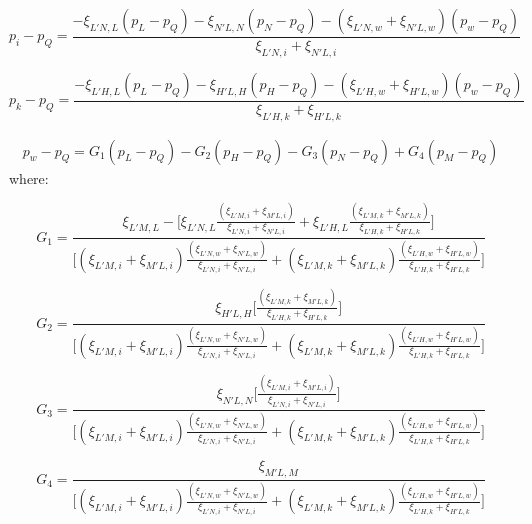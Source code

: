\documentclass{article}
\begin{document}
\begin{equation} \label{eq:pi_minus_pq_L}
p_{i} - p_{Q} = \frac{-\xi_{L'N,L}(p_{L}-p_{Q})-\xi_{N'L,N}(p_{N}-p_{Q}) -(\xi_{L'N,w}+\xi_{N'L,w})(p_{w}-p_{Q})}{\xi_{L'N,i}+\xi_{N'L,i}}
\end{equation}


\begin{equation} \label{eq:pk_minus_pq_L}
p_{k} - p_{Q} = \frac{-\xi_{L'H,L}(p_{L}-p_{Q})-\xi_{H'L,H}(p_{H}-p_{Q}) -(\xi_{L'H,w}+\xi_{H'L,w})(p_{w}-p_{Q})}{\xi_{L'H,k}+\xi_{H'L,k}}
\end{equation}

\begin{equation} \label{eq:pw_minus_pq_L}
\begin{split}
p_{w}-p_{Q} = G_{1}(p_{L}-p_{Q}) - G_{2}(p_{H} - p_{Q}) - G_{3}(p_{N}-p_{Q})+G_{4}(p_{M}-p_{Q})
\end{split}
\end{equation}
where:

\begin{displaymath}
G_{1} = \frac{\xi_{L'M,L} - \Bigg[\xi_{L'N,L}\frac{(\xi_{L'M,i}+\xi_{M'L,i})}{\xi_{L'N,i}+\xi_{N'L,i}} + \xi_{L'H,L}\frac{(\xi_{L'M,k}+\xi_{M'L,k})}{\xi_{L'H,k}+\xi_{H'L,k}} \Bigg]}{\Bigg[ (\xi_{L'M,i}+\xi_{M'L,i})\frac{(\xi_{L'N,w}+\xi_{N'L,w})}{\xi_{L'N,i}+\xi_{N'L,i}} + (\xi_{L'M,k}+\xi_{M'L,k})	\frac{(\xi_{L'H,w}+\xi_{H'L,w})}{\xi_{L'H,k}+\xi_{H'L,k}} \Bigg]}
\end{displaymath}

\begin{displaymath}
G_{2} =\frac{\xi_{H'L,H}\Bigg[ \frac{(\xi_{L'M,k}+\xi_{M'L,k})}{\xi_{L'H,k}+\xi_{H'L,k}} \Bigg]}{\Bigg[ (\xi_{L'M,i}+\xi_{M'L,i})\frac{(\xi_{L'N,w}+\xi_{N'L,w})}{\xi_{L'N,i}+\xi_{N'L,i}} + (\xi_{L'M,k}+\xi_{M'L,k})	\frac{(\xi_{L'H,w}+\xi_{H'L,w})}{\xi_{L'H,k}+\xi_{H'L,k}} \Bigg]}
\end{displaymath}

\begin{displaymath}
G_{3} = \frac{\xi_{N'L,N}\Bigg[ \frac{(\xi_{L'M,i}+\xi_{M'L,i})}{\xi_{L'N,i}+\xi_{N'L,i}}\Bigg]}{\Bigg[ (\xi_{L'M,i}+\xi_{M'L,i})\frac{(\xi_{L'N,w}+\xi_{N'L,w})}{\xi_{L'N,i}+\xi_{N'L,i}} + (\xi_{L'M,k}+\xi_{M'L,k})	\frac{(\xi_{L'H,w}+\xi_{H'L,w})}{\xi_{L'H,k}+\xi_{H'L,k}} \Bigg]}
\end{displaymath}

\begin{displaymath}
G_{4} = \frac{\xi_{M'L,M}}{\Bigg[ (\xi_{L'M,i}+\xi_{M'L,i})\frac{(\xi_{L'N,w}+\xi_{N'L,w})}{\xi_{L'N,i}+\xi_{N'L,i}} + (\xi_{L'M,k}+\xi_{M'L,k})	\frac{(\xi_{L'H,w}+\xi_{H'L,w})}{\xi_{L'H,k}+\xi_{H'L,k}} \Bigg]}
\end{displaymath}
\end{document}
